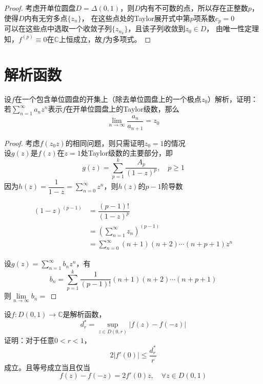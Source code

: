 \begin{proof}
    
    考虑开单位圆盘$D = \Delta(0,1)$，则$D$内有不可数的点，所以存在正整数$p$，使得$D$内有无穷多点$\{z_n\}$，
    在这些点处的\textup{Taylor}展开式中第$p$项系数$c_p=0$\\
    可以在这些点中选取一个收敛子列$\{z_{n_k}\}$，且该子列收敛到$z_0\in D$，
    由唯一性定理知，$f^{(p)}\equiv 0$在$\mathbb{C}$上恒成立，故$f$为多项式。

\end{proof}

\section{解析函数}

\begin{proposition}
    
    设$f$在一个包含单位圆盘的开集上（除去单位圆盘上的一个极点$z_0$）解析，证明：
    若$\sum\limits_{n=1}^{\infty}{a_nz^n}$表示$f$在开单位圆盘上的\textup{Taylor}级数，那么
    $$\lim\limits_{n\to\infty}{\dfrac{a_n}{a_{n+1}}} = z_0$$

\end{proposition}

\begin{proof}
    
    考虑$f(z_0z)$的相同问题，则只需证明$z_0 = 1$的情况\\
    设$g(z)$是$f(z)$在$z=1$处\textup{Taylor}级数的主要部分，即
    $$g(z) = \sum\limits_{p=1}^{k}{\dfrac{A_p}{(1-z)^p}},\quad p \geq 1$$
    因为$h(z) = \dfrac{1}{1-z} = \sum\limits_{n=0}^{\infty}{z^n}$，则$h(z)$的$p-1$阶导数
    
    \begin{align*}
        (1-z)^{(p-1)} & = \dfrac{(p-1)!}{(1-z)^p}\\
        & = \left(\sum\limits_{n=1}^{\infty}{z_n}\right)^{(p-1)}\\
        & = \sum\limits_{n=0}^{\infty}{(n+1)(n+2)\cdots(n+p+1)z^n}
    \end{align*}

    设$g(z) = \sum\limits_{n=1}^{\infty}{b_nz^n}$，有
    $$b_n = \sum\limits_{p=1}^{k}{\dfrac{1}{(p-1)!}(n+1)(n+2)\cdots(n+p+1)}$$
    则$\lim\limits_{n\to\infty}{b_n} = $

\end{proof}

\begin{proposition}

    设$f : D(0,1) \to \mathbb{C}$是解析函数，
    $$d_r^{*} = \sup\limits_{z \in D(0,r)}{|f(z) - f(-z)|}$$
    证明：对于任意$0 < r < 1$，
    $$2|f'(0)| \leq \dfrac{d_r^{*}}{r}$$
    成立。且等号成立当且仅当
    $$f(z) - f(-z) = 2f'(0)z, \quad \forall z \in D(0,1)$$

\end{proposition}

